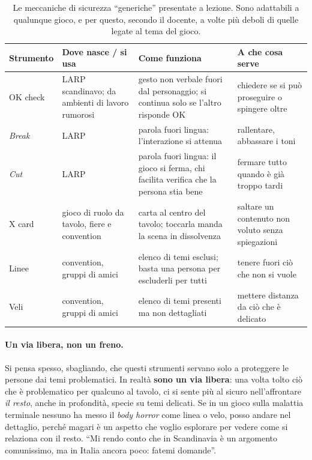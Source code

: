 \begin{table}[htbp]
\centering
\small
\begin{tabular}{@{}p{2.3cm}p{2.6cm}p{4.2cm}p{4.2cm}@{}}
\toprule
\textbf{Strumento} & \textbf{Dove nasce / si usa} & \textbf{Come funziona} &
\textbf{A che cosa serve} \\
\midrule
OK check & LARP scandinavo; da ambienti di lavoro rumorosi & gesto non verbale fuori
dal personaggio; si continua solo se l'altro risponde OK & chiedere se si può
proseguire o spingere oltre \\
\emph{Break} & LARP & parola fuori lingua: l'interazione si attenua & rallentare,
abbassare i toni \\
\emph{Cut} & LARP & parola fuori lingua: il gioco si ferma, chi facilita verifica che
la persona stia bene & fermare tutto quando è già troppo tardi \\
X card & gioco di ruolo da tavolo, fiere e convention & carta al centro del tavolo;
toccarla manda la scena in dissolvenza & saltare un contenuto non voluto senza
spiegazioni \\
Linee & convention, gruppi di amici & elenco di temi esclusi; basta una persona per
escluderli per tutti & tenere fuori ciò che non si vuole \\
Veli & convention, gruppi di amici & elenco di temi presenti ma non dettagliati &
mettere distanza da ciò che è delicato \\
\bottomrule
\end{tabular}
\caption{Le meccaniche di sicurezza ``generiche'' presentate a lezione. Sono
adattabili a qualunque gioco, e per questo, secondo il docente, a volte più deboli di
quelle legate al tema del gioco.}
\label{a5:tab:sicurezza}
\end{table}

\paragraph{Un via libera, non un freno.} Si pensa spesso, sbagliando, che questi
strumenti servano solo a proteggere le persone dai temi problematici. In realtà
\textbf{sono un via libera}: una volta tolto ciò che è problematico per qualcuno al
tavolo, ci si sente più al sicuro nell'affrontare \emph{il resto}, anche in profondità,
specie su temi delicati. Se in un gioco sulla malattia terminale nessuno ha messo il
\emph{body horror} come linea o velo, posso andare nel dettaglio, perché magari è un
aspetto che voglio esplorare per vedere come si relaziona con il resto. ``Mi rendo
conto che in Scandinavia è un argomento comunissimo, ma in Italia ancora poco: fatemi
domande''.

